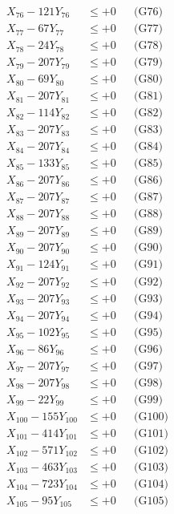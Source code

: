 \documentclass[a4paper,10pt]{article}
\begin{document}
{\begin{align}
X_{76} - 121Y_{76} &\leq +0 && \text{(G76)} \\
X_{77} - 67Y_{77} &\leq +0 && \text{(G77)} \\
X_{78} - 24Y_{78} &\leq +0 && \text{(G78)} \\
X_{79} - 207Y_{79} &\leq +0 && \text{(G79)} \\
X_{80} - 69Y_{80} &\leq +0 && \text{(G80)} \\
\allowbreak
X_{81} - 207Y_{81} &\leq +0 && \text{(G81)} \\
X_{82} - 114Y_{82} &\leq +0 && \text{(G82)} \\
X_{83} - 207Y_{83} &\leq +0 && \text{(G83)} \\
X_{84} - 207Y_{84} &\leq +0 && \text{(G84)} \\
X_{85} - 133Y_{85} &\leq +0 && \text{(G85)} \\
X_{86} - 207Y_{86} &\leq +0 && \text{(G86)} \\
X_{87} - 207Y_{87} &\leq +0 && \text{(G87)} \\
X_{88} - 207Y_{88} &\leq +0 && \text{(G88)} \\
X_{89} - 207Y_{89} &\leq +0 && \text{(G89)} \\
X_{90} - 207Y_{90} &\leq +0 && \text{(G90)} \\
\allowbreak
X_{91} - 124Y_{91} &\leq +0 && \text{(G91)} \\
X_{92} - 207Y_{92} &\leq +0 && \text{(G92)} \\
X_{93} - 207Y_{93} &\leq +0 && \text{(G93)} \\
X_{94} - 207Y_{94} &\leq +0 && \text{(G94)} \\
X_{95} - 102Y_{95} &\leq +0 && \text{(G95)} \\
X_{96} - 86Y_{96} &\leq +0 && \text{(G96)} \\
X_{97} - 207Y_{97} &\leq +0 && \text{(G97)} \\
X_{98} - 207Y_{98} &\leq +0 && \text{(G98)} \\
X_{99} - 22Y_{99} &\leq +0 && \text{(G99)} \\
X_{100} - 155Y_{100} &\leq +0 && \text{(G100)} \\
\allowbreak
X_{101} - 414Y_{101} &\leq +0 && \text{(G101)} \\
X_{102} - 571Y_{102} &\leq +0 && \text{(G102)} \\
X_{103} - 463Y_{103} &\leq +0 && \text{(G103)} \\
X_{104} - 723Y_{104} &\leq +0 && \text{(G104)} \\
X_{105} - 95Y_{105} &\leq +0 && \text{(G105)} \\

\end{align}}
\end{document}
